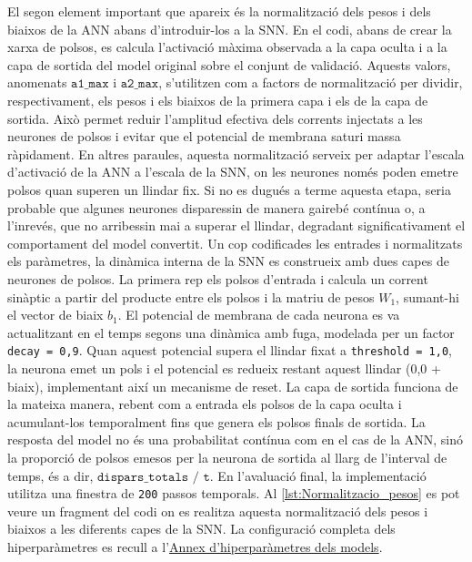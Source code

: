 \documentclass[a4paper,11pt, titlepage, twoside]{article}
\begin{document}
El segon element important que apareix és la normalització dels pesos i dels biaixos de la ANN abans d'introduir-los a la SNN. En el codi, abans de crear la xarxa de polsos, es calcula l'activació màxima observada a la capa oculta i a la capa de sortida del model original sobre el conjunt de validació. Aquests valors, anomenats $\texttt{a1\_max}$ i $\texttt{a2\_max}$, s'utilitzen com a factors de normalització per dividir, respectivament, els pesos i els biaixos de la primera capa i els de la capa de sortida. Això permet reduir l'amplitud efectiva dels corrents injectats a les neurones de polsos i evitar que el potencial de membrana saturi massa ràpidament. En altres paraules, aquesta normalització serveix per adaptar l'escala d'activació de la ANN a l'escala de la SNN, on les neurones només poden emetre polsos quan superen un llindar fix. Si no es dugués a terme aquesta etapa, seria probable que algunes neurones disparessin de manera gairebé contínua o, a l'inrevés, que no arribessin mai a superar el llindar, degradant significativament el comportament del model convertit.
Un cop codificades les entrades i normalitzats els paràmetres, la dinàmica interna de la SNN es construeix amb dues capes de neurones de polsos. La primera rep els polsos d'entrada i calcula un corrent sinàptic a partir del producte entre els polsos i la matriu de pesos $W_1$, sumant-hi el vector de biaix $b_1$. El potencial de membrana de cada neurona es va actualitzant en el temps segons una dinàmica amb fuga, modelada per un factor \texttt{decay = 0,9}. Quan aquest potencial supera el llindar fixat a \texttt{threshold = 1,0}, la neurona emet un pols i el potencial es redueix restant aquest llindar (0,0 + biaix), implementant així un mecanisme de reset. La capa de sortida funciona de la mateixa manera, rebent com a entrada els polsos de la capa oculta i acumulant-los temporalment fins que genera els polsos finals de sortida. La resposta del model no és una probabilitat contínua com en el cas de la ANN, sinó la proporció de polsos emesos per la neurona de sortida al llarg de l'interval de temps, és a dir, $\texttt{dispars\_totals / t}$. En l'avaluació final, la implementació utilitza una finestra de \texttt{200} passos temporals. Al \autoref{lst:Normalitzacio_pesos} es pot veure un fragment del codi on es realitza aquesta normalització dels pesos i biaixos a les diferents capes de la SNN. La configuració completa dels hiperparàmetres es recull a l'\hyperref[annex:hiperparametres]{Annex d'hiperparàmetres dels models}.
\end{document}
